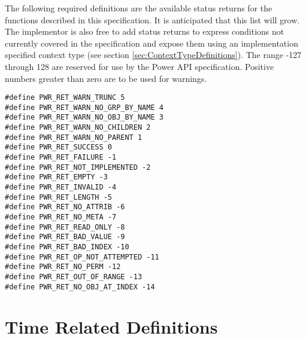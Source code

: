 The following required definitions are the available status returns for the functions described in this specification. 
It is anticipated that this list will grow. 
The implementor is also free to add status returns to express conditions not currently covered in the specification and expose them using an implementation specified context type (see section \ref{sec:ContextTypeDefinitions}).
The range -127 through 128 are reserved for use by the Power API specification.
Positive numbers greater than zero are to be used for warnings.


\begin{center}
\begin{minipage}{.95\linewidth}%
\begin{lstlisting}
#define PWR_RET_WARN_TRUNC 5
#define PWR_RET_WARN_NO_GRP_BY_NAME 4
#define PWR_RET_WARN_NO_OBJ_BY_NAME 3
#define PWR_RET_WARN_NO_CHILDREN 2
#define PWR_RET_WARN_NO_PARENT 1
#define PWR_RET_SUCCESS 0
#define PWR_RET_FAILURE -1
#define PWR_RET_NOT_IMPLEMENTED -2
#define PWR_RET_EMPTY -3
#define PWR_RET_INVALID -4
#define PWR_RET_LENGTH -5
#define PWR_RET_NO_ATTRIB -6
#define PWR_RET_NO_META -7
#define PWR_RET_READ_ONLY -8
#define PWR_RET_BAD_VALUE -9
#define PWR_RET_BAD_INDEX -10
#define PWR_RET_OP_NOT_ATTEMPTED -11
#define PWR_RET_NO_PERM -12
#define PWR_RET_OUT_OF_RANGE -13
#define PWR_RET_NO_OBJ_AT_INDEX -14
\end{lstlisting}
\end{minipage}
\end{center}


\section{Time Related Definitions}\label{sec:TimeRelatedDefinitions}

